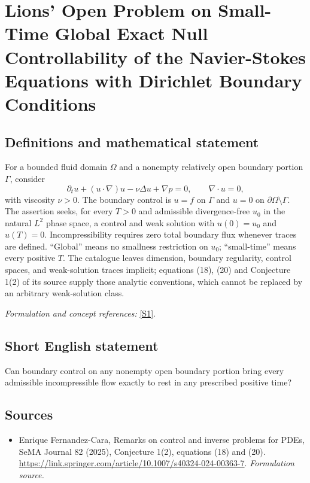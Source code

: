\documentclass[11pt]{article}
\begin{document}
\section*{\texorpdfstring{Lions' Open Problem on Small-Time Global Exact Null Controllability of the Navier-Stokes Equations with Dirichlet Boundary Conditions}{Lions' Open Problem on Small-Time Global Exact Null Controllability of the Navier-Stokes Equations with Dirichlet Boundary Conditions}}\label{30006863}
\subsection{Definitions and mathematical statement}
For a bounded fluid domain $\Omega$ and a nonempty relatively open boundary portion $\Gamma$, consider
\[
 \partial_tu+(u\cdot\nabla)u-\nu\Delta u+\nabla p=0,
 \qquad\nabla\cdot u=0,
\]
with viscosity $\nu>0$. The boundary control is $u=f$ on $\Gamma$ and $u=0$ on $\partial\Omega\setminus\Gamma$. The assertion seeks, for every $T>0$ and admissible divergence-free $u_0$ in the natural $L^2$ phase space, a control and weak solution with $u(0)=u_0$ and $u(T)=0$. Incompressibility requires zero total boundary flux whenever traces are defined. ``Global'' means no smallness restriction on $u_0$; ``small-time'' means every positive $T$. The catalogue leaves dimension, boundary regularity, control spaces, and weak-solution traces implicit; equations (18), (20) and Conjecture 1(2) of its source supply those analytic conventions, which cannot be replaced by an arbitrary weak-solution class.
\par\smallskip\textit{Formulation and concept references:} \href{https://link.springer.com/article/10.1007/s40324-024-00363-7}{[S1]}.

\subsection{Short English statement}
Can boundary control on any nonempty open boundary portion bring every admissible incompressible flow exactly to rest in any prescribed positive time?
\subsection{Sources}
\begin{itemize}
\item[S1]Enrique Fernandez-Cara, Remarks on control and inverse problems for PDEs, SeMA Journal 82 (2025), Conjecture 1(2), equations (18) and (20).
\url{https://link.springer.com/article/10.1007/s40324-024-00363-7}.
\textit{Formulation source.}
\end{itemize}
\end{document}
